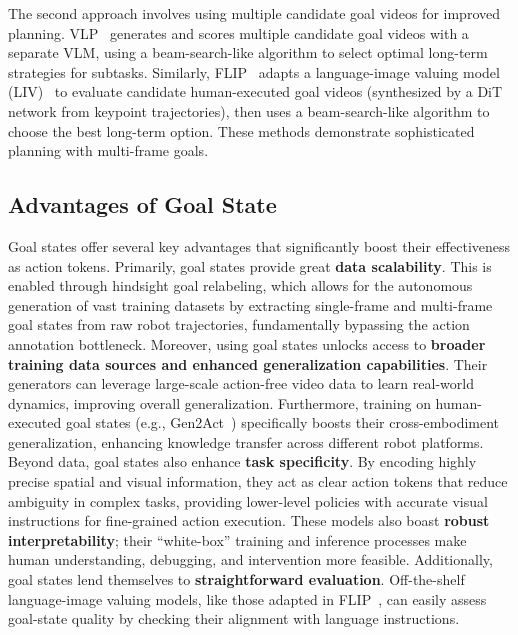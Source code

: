 \documentclass[10pt, a4paper, logo, copyright]{googledeepmind} %
\begin{document}
    The second approach involves using multiple candidate goal videos for improved planning. VLP~\cite{du2023video} generates and scores multiple candidate goal videos with a separate VLM, using a beam-search-like algorithm to select optimal long-term strategies for subtasks. Similarly, FLIP~\cite{flip} adapts a language-image valuing model (LIV)~\cite{ma2023livlanguageimagerepresentationsrewards} to evaluate candidate human-executed goal videos (synthesized by a DiT network from keypoint trajectories), then uses a beam-search-like algorithm to choose the best long-term option. These methods demonstrate sophisticated planning with multi-frame goals. 




\subsection{Advantages of Goal State}
Goal states offer several key advantages that significantly boost their effectiveness as action tokens. Primarily, goal states provide great \textbf{data scalability}. This is enabled through hindsight goal relabeling, which allows for the autonomous generation of vast training datasets by extracting single-frame and multi-frame goal states from raw robot trajectories, fundamentally bypassing the action annotation bottleneck. 
Moreover, using goal states unlocks access to \textbf{broader training data sources and enhanced generalization capabilities}. Their generators can leverage large-scale action-free video data to learn real-world dynamics, improving overall generalization. Furthermore, training on human-executed goal states (e.g., Gen2Act~\cite{bharadhwaj2024gen2acthumanvideogeneration}) specifically boosts their cross-embodiment generalization, enhancing knowledge transfer across different robot platforms.
Beyond data, goal states also enhance \textbf{task specificity}. By encoding highly precise spatial and visual information, they act as clear action tokens that reduce ambiguity in complex tasks, providing lower-level policies with accurate visual instructions for fine-grained action execution. These models also boast \textbf{robust interpretability}; their ``white-box'' training and inference processes make human understanding, debugging, and intervention more feasible. Additionally, goal states lend themselves to \textbf{straightforward evaluation}. Off-the-shelf language-image valuing models, like those adapted in FLIP~\cite{flip}, can easily assess goal-state quality by checking their alignment with language instructions. 
\end{document}
